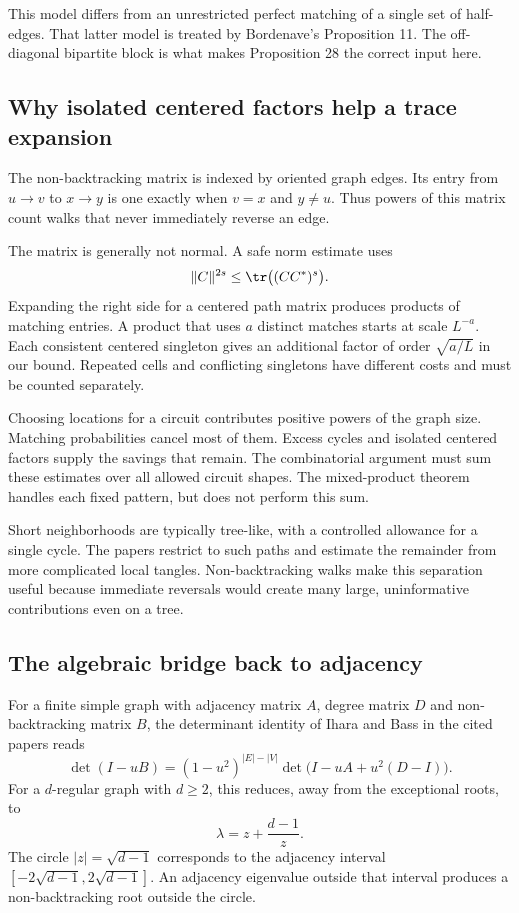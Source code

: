 This model differs from an unrestricted perfect matching of a single set of half-edges. That latter model is treated by Bordenave's Proposition 11. The off-diagonal bipartite block is what makes Proposition 28 the correct input here.

\subsection{Why isolated centered factors help a trace expansion}

The non-backtracking matrix is indexed by oriented graph edges. Its entry from $u\to v$ to $x\to y$ is one exactly when $v=x$ and $y\ne u$. Thus powers of this matrix count walks that never immediately reverse an edge.

The matrix is generally not normal. A safe norm estimate uses
\[
\|C\|^{2s}\le\tr\bigl((CC^*)^s\bigr).
\]
Expanding the right side for a centered path matrix produces products of matching entries. A product that uses $a$ distinct matches starts at scale $L^{-a}$. Each consistent centered singleton gives an additional factor of order $\sqrt{a/L}$ in our bound. Repeated cells and conflicting singletons have different costs and must be counted separately.

Choosing locations for a circuit contributes positive powers of the graph size. Matching probabilities cancel most of them. Excess cycles and isolated centered factors supply the savings that remain. The combinatorial argument must sum these estimates over all allowed circuit shapes. The mixed-product theorem handles each fixed pattern, but does not perform this sum.

Short neighborhoods are typically tree-like, with a controlled allowance for a single cycle. The papers restrict to such paths and estimate the remainder from more complicated local tangles. Non-backtracking walks make this separation useful because immediate reversals would create many large, uninformative contributions even on a tree.

\subsection{The algebraic bridge back to adjacency}

For a finite simple graph with adjacency matrix $A$, degree matrix $D$ and non-backtracking matrix $B$, the determinant identity of Ihara and Bass in the cited papers reads
\begin{equation}\label{eq:ihara}
\det(I-uB)=(1-u^2)^{|E|-|V|}\det\bigl(I-uA+u^2(D-I)\bigr).
\end{equation}
For a $d$-regular graph with $d\ge2$, this reduces, away from the exceptional roots, to
\[
\lambda=z+\frac{d-1}{z}.
\]
The circle $|z|=\sqrt{d-1}$ corresponds to the adjacency interval $[-2\sqrt{d-1},2\sqrt{d-1}]$. An adjacency eigenvalue outside that interval produces a non-backtracking root outside the circle.

